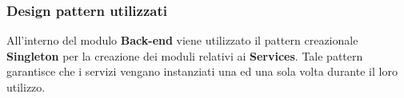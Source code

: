 \subsubsection{Design pattern utilizzati}
All'interno del modulo \textbf{Back-end} viene utilizzato il pattern creazionale \textbf{Singleton} per la creazione dei moduli relativi ai \textbf{Services}. Tale pattern garantisce che i servizi vengano instanziati una ed una sola volta durante il loro utilizzo.